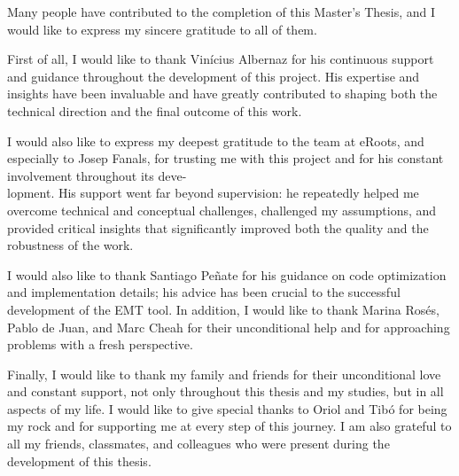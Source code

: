 Many people have contributed to the completion of this Master's Thesis, 
and I would like to express my sincere gratitude to all of them.

First of all, I would like to thank Vinícius Albernaz for his continuous support and guidance throughout the development of this project. 
His expertise and insights have been invaluable and have greatly contributed to shaping both the technical direction and the final outcome of this work.

I would also like to express my deepest gratitude to the team at eRoots, and especially to Josep Fanals, 
for trusting me with this project and for his constant involvement throughout its deve-\\lopment. 
His support went far beyond supervision: he repeatedly helped me overcome technical and conceptual challenges, challenged my assumptions, 
and provided critical insights that significantly improved both the quality and the robustness of the work.

I would also like to thank Santiago Peñate for his guidance on code optimization and implementation details; 
his advice has been crucial to the successful development of the EMT tool. In addition, I would like to thank Marina Rosés, 
Pablo de Juan, and Marc Cheah for their unconditional help and for approaching problems with a fresh perspective.

Finally, I would like to thank my family and friends for their unconditional love and constant support, not only throughout this thesis and my studies, 
but in all aspects of my life. I would like to give special thanks to Oriol and Tibó for being my rock and for supporting me at every step of this journey. 
I am also grateful to all my friends, classmates, and colleagues who were present during the development of this thesis.